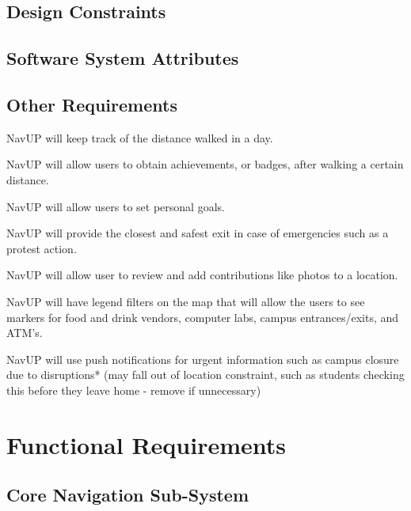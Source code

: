 \documentclass[12pt,a4paper]{article}
\begin{document}
\begin{RequirementsEnum}
	\subsection{Design Constraints}
	\subsection{Software System Attributes}
	\subsection{Other Requirements}
\item NavUP will keep track of the distance walked in a day.
\item NavUP will allow users to obtain achievements, or badges, after walking a certain distance.
\item NavUP will allow users to set personal goals.
\item NavUP will provide the closest and safest exit in case of emergencies such as a protest action.
\item NavUP will allow user to review and add contributions like photos to a location.
\item NavUP will have legend filters on the map that will allow the users to see markers for food and drink vendors, computer labs, campus entrances/exits, and ATM’s.
\item NavUP will use push notifications for urgent information such as campus closure due to disruptions* (may fall out of location constraint, such as students checking this before they leave home - remove if unnecessary)
	\end{RequirementsEnum}
\section{Functional Requirements}
	\subsection{Core Navigation Sub-System}
\end{document}
